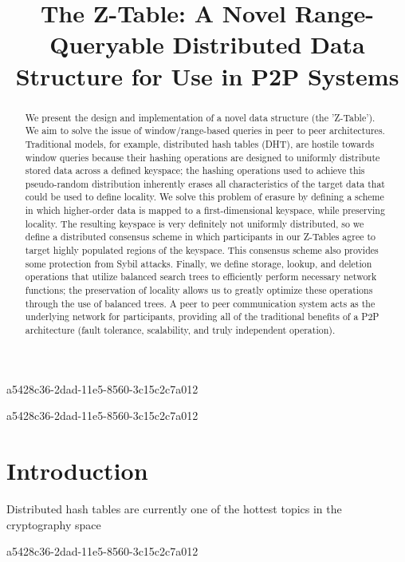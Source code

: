 \documentclass[12pt]{article}
\title{The Z-Table: A Novel Range-Queryable Distributed Data Structure for Use in P2P Systems}
\begin{document}
a5428c36-2dad-11e5-8560-3c15c2c7a012
\maketitle

\begin{abstract}
We present the design and implementation of a novel data structure (the 'Z-Table'). We aim to solve the issue of window/range-based queries in peer to peer architectures. Traditional models, for example,  distributed hash tables (DHT), are hostile towards window queries because their hashing operations are designed to uniformly distribute stored data across a defined keyspace; the hashing operations used to achieve this pseudo-random distribution inherently erases all characteristics of the target data that could be used to define locality. We solve this problem of erasure by defining a scheme in which higher-order data is mapped to a first-dimensional keyspace, while preserving locality. The resulting keyspace is very definitely not uniformly distributed, so we define a distributed consensus scheme in which participants in our Z-Tables agree to target highly populated regions of the keyspace. This consensus scheme also provides some protection from Sybil attacks. Finally, we define storage, lookup, and deletion operations that utilize balanced search trees to efficiently perform necessary network functions; the preservation of locality allows us to greatly optimize these operations through the use of balanced trees. A peer to peer communication system acts as the underlying network for participants, providing all of the traditional benefits of a P2P architecture (fault tolerance, scalability, and truly independent operation).
\end{abstract}

a5428c36-2dad-11e5-8560-3c15c2c7a012
\newpage
\section{Introduction}
Distributed hash tables are currently one of the hottest topics in the cryptography space~\cite{Stoica:2001dj,Rowstron:2001ea,Ratnasamy:2001wn}

a5428c36-2dad-11e5-8560-3c15c2c7a012\printbibliography
\end{document}
